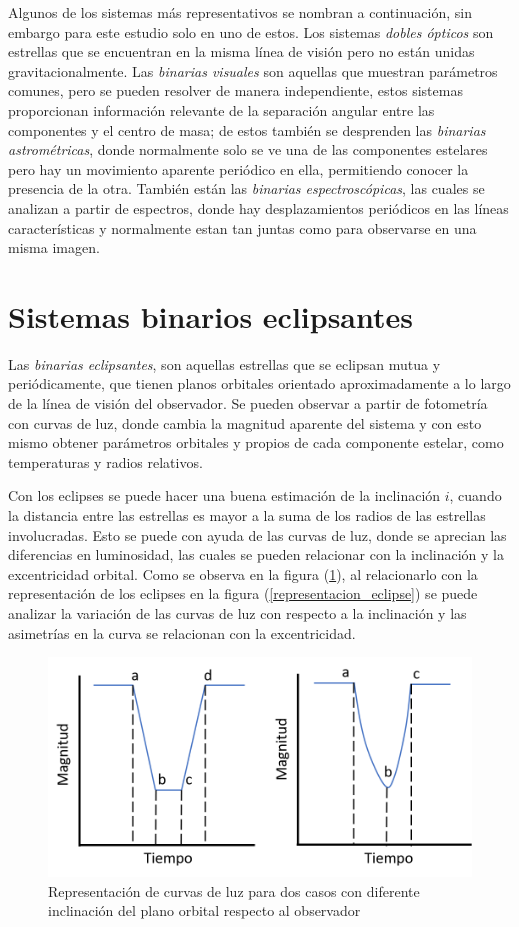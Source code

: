 \documentclass[12pt,oneside,openany,letter]{book}
\begin{document}
\noindent Algunos de los sistemas más representativos se nombran a continuación, sin embargo para este estudio solo en uno de estos. Los sistemas \textit{dobles ópticos} son estrellas que se encuentran en la misma línea de visión pero no están unidas gravitacionalmente.  Las \textit{binarias visuales} son aquellas que muestran parámetros comunes, pero se pueden resolver de manera independiente, estos sistemas proporcionan información relevante de la separación angular entre las componentes y el centro de masa; de estos también se desprenden las \textit{binarias astrométricas}, donde normalmente solo se ve una de las componentes estelares pero hay un movimiento aparente periódico en ella, permitiendo conocer la presencia de la otra. También están las \textit{binarias espectroscópicas}, las cuales se analizan a partir de espectros, donde hay desplazamientos periódicos en las líneas características y normalmente estan tan juntas como para observarse en una misma imagen.

\section{Sistemas binarios eclipsantes}
Las \textit{binarias eclipsantes}, son aquellas estrellas que se eclipsan mutua y periódicamente, que tienen planos orbitales orientado aproximadamente a lo largo de la línea de visión del observador. Se pueden observar a partir de fotometría con curvas de luz, donde cambia la magnitud aparente del sistema y con esto mismo obtener parámetros orbitales y propios de cada componente estelar, como temperaturas y radios relativos.

\noindent Con los eclipses se puede hacer una buena estimación de la inclinación $i$, cuando la distancia entre las estrellas es mayor a la suma de los radios de las estrellas involucradas. Esto se puede con ayuda de las curvas de luz, donde se aprecian las diferencias en luminosidad, las cuales se pueden relacionar con la inclinación y la  excentricidad orbital. Como se observa en la figura (\ref{fig:curva_luz}), al relacionarlo con la representación de los eclipses en la figura (\ref{representacion_eclipse}) se puede analizar la variación de las curvas de luz con respecto a la inclinación y las asimetrías en la curva se relacionan con la excentricidad.

\begin{figure}[h]
    \centering
    \includegraphics[width=0.65\linewidth]{Images/curvaluz.png}
    \caption{Representación de curvas de luz para dos casos con diferente inclinación del plano orbital respecto al observador}
    \label{fig:curva_luz}
\end{figure}
\end{document}
